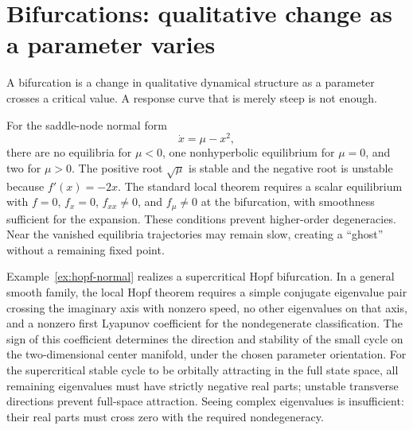 \section{Bifurcations: qualitative change as a parameter varies}
A bifurcation is a change in qualitative dynamical structure as a parameter crosses a critical value. A response curve that is merely steep is not enough.

For the saddle-node normal form
\begin{equation}
\dot x=\mu-x^2,
\end{equation}
there are no equilibria for $\mu<0$, one nonhyperbolic equilibrium for $\mu=0$, and two for $\mu>0$. The positive root $\sqrt\mu$ is stable and the negative root is unstable because $f'(x)=-2x$. The standard local theorem requires a scalar equilibrium with $f=0$, $f_x=0$, $f_{xx}\ne0$, and $f_\mu\ne0$ at the bifurcation, with smoothness sufficient for the expansion. These conditions prevent higher-order degeneracies. Near the vanished equilibria trajectories may remain slow, creating a ``ghost'' without a remaining fixed point.

Example~\ref{ex:hopf-normal} realizes a supercritical Hopf bifurcation. In a general smooth family, the local Hopf theorem requires a simple conjugate eigenvalue pair crossing the imaginary axis with nonzero speed, no other eigenvalues on that axis, and a nonzero first Lyapunov coefficient for the nondegenerate classification. The sign of this coefficient determines the direction and stability of the small cycle on the two-dimensional center manifold, under the chosen parameter orientation. For the supercritical stable cycle to be orbitally attracting in the full state space, all remaining eigenvalues must have strictly negative real parts; unstable transverse directions prevent full-space attraction. Seeing complex eigenvalues is insufficient: their real parts must cross zero with the required nondegeneracy.

